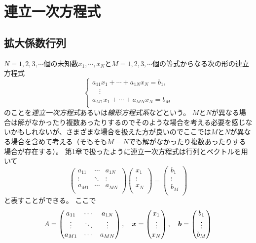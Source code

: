 
\chapter{連立一次方程式}

\section{拡大係数行列}

$N = 1, 2, 3, \cdots$個の未知数$x_1, \cdots, x_N$と$M = 1, 2, 3, \cdots$個の等式からなる次の形の連立方程式
$$
\begin{cases}
a_{1 1}x_1+\cdots+a_{1 N}x_N = b_1, \\
\quad \vdots \\
a_{M 1}x_1+\cdots+a_{M N}x_N = b_M \\
\end{cases}
$$
のことを\emph{連立一次方程式}あるいは\emph{線形方程式系}などという。
$M$と$N$が異なる場合は解がなかったり複数あったりするのでそのような場合を考える必要を感じないかもしれないが、さまざまな場合を扱えた方が良いのでここでは$M$と$N$が異なる場合を含めて考える（そもそも$M = N$でも解がなかったり複数あったりする場合が存在する）。
第1章で扱ったように連立一次方程式は行列とベクトルを用いて
$$
\begin{pmatrix}
a_{1 1} & \cdots & a_{1 N} \\
\vdots & \ddots & \vdots \\
a_{M 1} & \cdots & a_{M N} \\
\end{pmatrix}
\begin{pmatrix}
x_1 \\
\vdots \\
x_N \\
\end{pmatrix}
=
\begin{pmatrix}
b_1 \\
\vdots \\
b_M \\
\end{pmatrix}
$$
と表すことができる。
ここで
$$
A =
\begin{pmatrix}
a_{1 1} & \cdots & a_{1 N} \\
\vdots & \ddots & \vdots \\
a_{M 1} & \cdots & a_{M N} \\
\end{pmatrix},
\quad
\vb*{x} =
\begin{pmatrix}
x_1 \\
\vdots \\
x_N \\
\end{pmatrix},
\quad
\vb*{b} =
\begin{pmatrix}
b_1 \\
\vdots \\
b_M \\
\end{pmatrix}
$$
